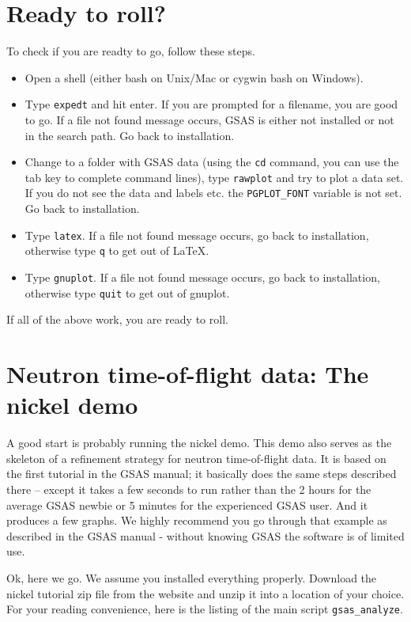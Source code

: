 \section{Ready to roll?}
To check if you are readty to go, follow these steps.
\begin{itemize}
\item Open a shell (either bash on Unix/Mac or cygwin bash on Windows).
\item Type \texttt{expedt} and hit enter. If you are prompted for a filename, you are good to go. If a file not found message occurs, GSAS is either not installed or not in the search path. Go back to installation.
\item Change to a folder with GSAS data (using the \texttt{cd} command, you can use the tab key to complete command lines), type \texttt{rawplot} and try to plot a data set. If you do not see the data and labels etc. the \texttt{PGPLOT\_FONT} variable is not set. Go back to installation.
\item Type \texttt{latex}. If a file not found message occurs, go back to installation, otherwise type \texttt{q} to get out of \LaTeX.
\item Type \texttt{gnuplot}. If a file not found message occurs, go back to installation, otherwise type \texttt{quit} to get out of gnuplot.
\end{itemize}
If all of the above work, you are ready to roll.

\section{Neutron time-of-flight data: The nickel demo}
A good start is probably running the nickel demo. This demo also serves as the skeleton of a refinement strategy for neutron time-of-flight data. It is based on the first tutorial in the GSAS manual; it basically does the same steps described there -- except it takes a few seconds to run rather than the 2 hours for the average GSAS newbie or 5 minutes for the experienced GSAS user. And it produces a few graphs. We highly recommend you go through that example as described in the GSAS manual - without knowing GSAS the \gl\hspace{0.5em} software is of limited use.

Ok, here we go. We assume you installed everything properly. Download the nickel tutorial zip file from the \gl\hspace{0.5em} website and unzip it into a location of your choice. For your reading convenience, here is the listing of the main script \texttt{gsas\_analyze}.

